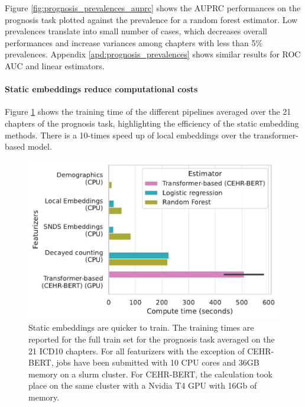 \documentclass[french,12pt,twoside,a4paper]{book}
\begin{document}
Figure \ref{fig:prognosis_prevalences_auprc} shows the AUPRC
performances on the prognosis task plotted against the prevalence for a random
forest estimator. Low prevalences translate into small number of cases, which
decreases overall performances and increase variances among chapters with less
than 5\% prevalences. Appendix \ref{apd:prognosis_prevalences} shows similar
results for ROC AUC and linear estimators.


\paragraph{Static embeddings reduce computational costs}%


Figure \ref{fig:prognosis_training_time} shows the training time of the
different pipelines averaged over the 21 chapters of the prognosis task,
highlighting the efficiency of the static embedding methods. There is a 10-times
speed up of local embeddings over the transformer-based model.

\begin{figure}[!h]
  \begin{minipage}{.35\linewidth}
    \caption{Static embeddings are quicker to train. The training times are
      reported for the full train set for the prognosis task averaged on the 21
      ICD10 chapters. For all featurizers with the exception of CEHR-BERT, jobs
      have been submitted with 10 CPU cores and 36GB memory on a slurm cluster. For
      CEHR-BERT, the calculation took place on the same cluster with a Nvidia T4
      GPU with 16Gb of memory.}\label{fig:prognosis_training_time}
  \end{minipage}%
  \hfill%
  \begin{minipage}{.62\linewidth}
    \includegraphics[width=\linewidth]{img/chapter_3/prognosis/training_testing_time_per_chapter.pdf}
  \end{minipage}
\end{figure}
\end{document}
